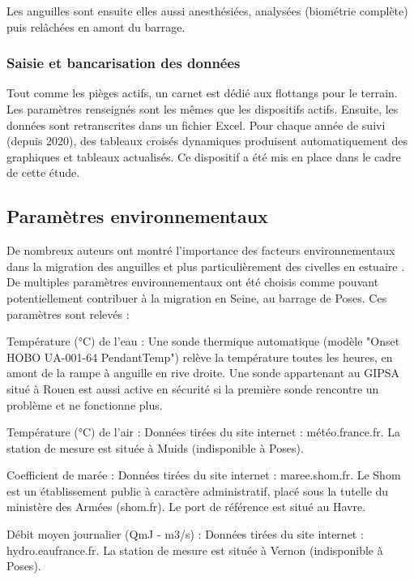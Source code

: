 \documentclass[11pt,titlepage,twoside]{article}\usepackage[]{graphicx}\usepackage[table]{xcolor}
\begin{document}
Les anguilles sont ensuite elles aussi anesthésiées, analysées (biométrie complète) puis relâchées en amont du barrage.

\subsubsection{Saisie et bancarisation des données }

Tout comme les pièges actifs, un carnet est dédié aux flottangs pour le terrain. Les paramètres renseignés sont les mêmes que les dispositifs actifs.
Ensuite, les données sont retranscrites dans un fichier Excel. Pour chaque année de suivi (depuis 2020), des tableaux croisés dynamiques produisent automatiquement des graphiques et tableaux actualisés. Ce dispositif  a été mis en place dans le cadre de cette étude.


\subsection{Paramètres environnementaux}

De nombreux auteurs ont montré l’importance des facteurs environnementaux dans la migration des anguilles et plus particulièrement des civelles en estuaire \citep{todd_timing_1981, white_environmental_1997, bardonnet_influence_2003, feunteun_review_2003}. De multiples paramètres environnementaux ont été choisis comme pouvant potentiellement contribuer à la migration en Seine, au barrage de Poses. Ces paramètres sont relevés :

Température (°C) de l’eau : Une sonde thermique automatique (modèle "Onset HOBO UA-001-64 PendantTemp") relève la température toutes les heures, en amont de la rampe à anguille en rive droite. Une sonde appartenant au GIPSA situé à Rouen est aussi active en sécurité si la première sonde rencontre un problème et ne fonctionne plus.

Température (°C) de l’air : Données tirées du site internet : météo.france.fr. La station de mesure est située à Muids (indisponible à Poses).

Coefficient de marée : Données tirées du site internet : maree.shom.fr. Le Shom est un établissement public à caractère administratif, placé sous la tutelle du ministère des Armées (shom.fr). Le port de référence est situé au Havre. 

Débit moyen journalier (QmJ - m3/s) : Données tirées du site internet : hydro.eaufrance.fr. La station de mesure est située à Vernon (indisponible à Poses). 
\end{document}
